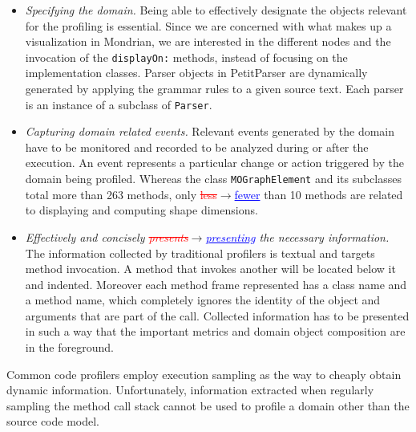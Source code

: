 \documentclass[runningheads]{llncs}
\newcommand{\ct}{\lstinline[backgroundcolor=\color{white},basicstyle=\footnotesize\ttfamily]}
\newcommand{\ra}{$\rightarrow$}
\newcommand{\chg}[2]{\textcolor{red}{\sout{#1}}{\ra}\textcolor{blue}{\uline{#2}}} %
\newcommand{\lr}[1]{\nb{Lukas}{orange}{#1}}
\begin{document}
\begin{itemize}
\item \emph{Specifying the domain.} Being able to effectively designate the objects relevant for the profiling is essential.
Since we are concerned with what makes up a visualization in Mondrian, we are interested in the different nodes and the invocation of the \ct{displayOn:} methods, instead of focusing on the implementation classes. 
Parser objects in PetitParser are dynamically generated by applying the grammar rules to a given source text. Each parser is an instance of a subclass of \ct{Parser}. 

\item \emph{Capturing domain related events.}
Relevant events generated by the domain have to be monitored and recorded to be analyzed during or after the execution. An event represents a particular change or action triggered by the domain being profiled. 
Whereas the class \ct{MOGraphElement} and its subclasses total more than 263 methods, only \chg{less}{fewer} than 10 methods are related to displaying and computing shape dimensions. 

 
\item \emph{Effectively and concisely \chg{presents}{presenting} the necessary information.} 
The information collected by traditional profilers is textual and targets method invocation. A method that invokes another will be located below it and indented. Moreover each method frame represented has a class name and a method name, which completely ignores the identity of the object and arguments that are part of the call.
Collected information has to be presented in such a way that the important metrics and domain object composition are in the foreground.  

\end{itemize}


Common code profilers employ execution sampling as the way to cheaply obtain dynamic information. Unfortunately, information extracted when regularly sampling the method call stack cannot be used to profile a domain other than the source code model.
\end{document}
